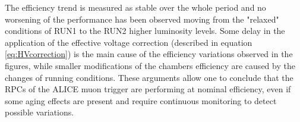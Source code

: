 The efficiency trend is measured as stable over the whole period and no worsening of the performance has been observed moving from the "relaxed" conditions of RUN1 to the RUN2 higher luminosity levels.
Some delay in the application of the effective voltage correction (described in equation \ref{eq:HVcorrection}) is the main cause of the efficiency variations observed in the figures, while smaller modifications of the chambers efficiency are caused by the changes of running conditions.
These arguments allow one to conclude that the RPCs of the ALICE muon trigger are performing at nominal efficiency, even if some aging effects are present and require continuous monitoring to detect possible variations.